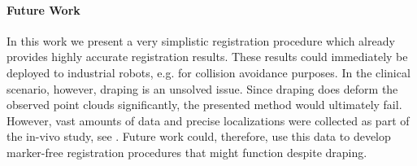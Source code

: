 \paragraph{Future Work} In this work we present a very simplistic registration procedure which already provides highly accurate registration results. These results could immediately be deployed to industrial robots, e.g. for collision avoidance purposes. In the clinical scenario, however, draping is an unsolved issue. Since draping does deform the observed point clouds significantly, the presented method would ultimately fail. However, vast amounts of data and precise localizations were collected as part of the in-vivo study, see . Future work could, therefore, use this data to develop marker-free registration procedures that might function despite draping.



